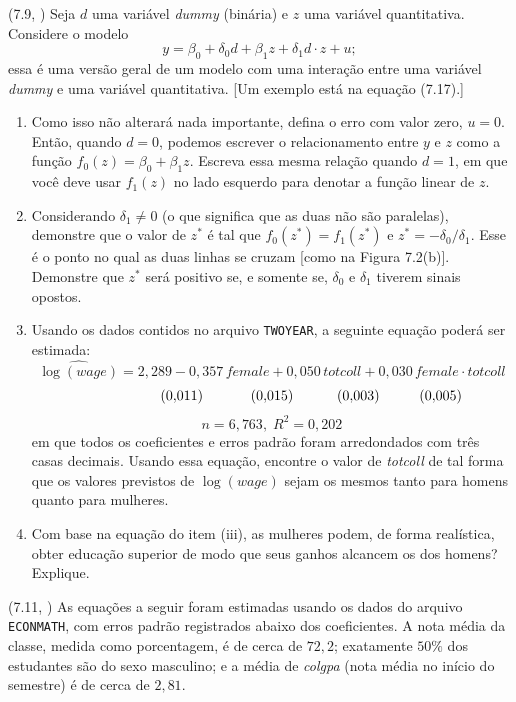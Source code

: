 \documentclass[12pt,letterpaper, onecolumn]{exam}
\begin{document}
\begin{questions}
\question (7.9, \citep{wooldridge2016}) Seja \(d\) uma variável \textit{dummy} (binária) e \(z\) uma variável quantitativa. Considere o modelo
\[
y = \beta_0 + \delta_0 d + \beta_1 z + \delta_1 d \cdot z + u;
\]
essa é uma versão geral de um modelo com uma interação entre uma variável \textit{dummy} e uma variável quantitativa. [Um exemplo está na equação (7.17).]
\begin{enumerate}[label=(\roman*)]
    \item Como isso não alterará nada importante, defina o erro com valor zero, \(u=0\). Então, quando \(d=0\), podemos escrever o relacionamento entre \(y\) e \(z\) como a função \(f_0(z)=\beta_0+\beta_1 z\). Escreva essa mesma relação quando \(d=1\), em que você deve usar \(f_1(z)\) no lado esquerdo para denotar a função linear de \(z\).
    \item Considerando \(\delta_1 \neq 0\) (o que significa que as duas não são paralelas), demonstre que o valor de \(z^\ast\) é tal que \(f_0(z^\ast)=f_1(z^\ast)\) e \(z^\ast = -\delta_0/\delta_1\). Esse é o ponto no qual as duas linhas se cruzam [como na Figura 7.2(b)]. Demonstre que \(z^\ast\) será positivo se, e somente se, \(\delta_0\) e \(\delta_1\) tiverem sinais opostos.
    \item Usando os dados contidos no arquivo \texttt{TWOYEAR}, a seguinte equação poderá ser estimada:
    \[
    \widehat{\log(wage)} = 2{,}289 - 0{,}357\,female + 0{,}050\,totcoll + 0{,}030\,female \cdot totcoll
    \]
    \[
    \hspace{2.0cm} (0{,}011)\hspace{1.2cm}(0{,}015)\hspace{1.1cm}(0{,}003)\hspace{1.0cm}(0{,}005)
    \]
    \[
    n = 6{,}763,\; R^2 = 0{,}202
    \]
    em que todos os coeficientes e erros padrão foram arredondados com três casas decimais. Usando essa equação, encontre o valor de \textit{totcoll} de tal forma que os valores previstos de \(\log(wage)\) sejam os mesmos tanto para homens quanto para mulheres.
    \item Com base na equação do item (iii), as mulheres podem, de forma realística, obter educação superior de modo que seus ganhos alcancem os dos homens? Explique.
\end{enumerate}

\vspace{0.7cm}

\question (7.11, \citep{wooldridge2016}) As equações a seguir foram estimadas usando os dados do arquivo \texttt{ECONMATH}, com erros padrão registrados abaixo dos coeficientes. A nota média da classe, medida como porcentagem, é de cerca de \(72{,}2\); exatamente \(50\%\) dos estudantes são do sexo masculino; e a média de \textit{colgpa} (nota média no início do semestre) é de cerca de \(2{,}81\).


\end{questions}
\end{document}
